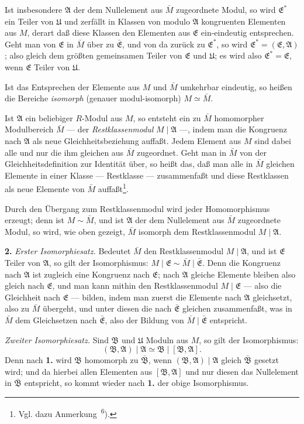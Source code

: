 \documentclass[12pt,a4paper]{article}
\newcommand{\fA}{\mathfrak{A}}
\newcommand{\fB}{\mathfrak{B}}
\newcommand{\fE}{\mathfrak{E}}
\newcommand{\fU}{\mathfrak{U}}
\theoremstyle{plain}
\theoremstyle{definition}
\theoremstyle{remark}
\begin{document}
Ist insbesondere $\fA$ der dem Nullelement aus $\bar{M}$ zugeordnete Modul, so wird $\fE^{*}$ ein Teiler von $\fU$ und zerfällt in Klassen von modulo $\fA$ kongruenten Elementen aus $M$, derart daß diese Klassen den Elementen aus $\fE$ ein-eindeutig entsprechen. Geht man von $\fE$ in $\bar{M}$ über zu $\bar{\fE}$, und von da zurück zu $\fE^{*}$, so wird $\fE^{*} = (\fE, \fA)$; also gleich dem größten gemeinsamen Teiler von $\fE$ und $\fU$; es wird also $\fE^{*} = \fE$, wenn $\fE$ Teiler von $\fU$.

Ist das Entsprechen der Elemente aus $M$ und $\bar{M}$ umkehrbar eindeutig, so heißen die Bereiche \textit{isomorph} (genauer modul-isomorph) $M \simeq \bar{M}$.

Ist $\fA$ ein beliebiger $R$-Modul aus $M$, so entsteht ein zu $\bar{M}$ homomorpher Modulbereich $\bar{M}$ --- der \textit{Restklassenmodul} $M \mid \fA$ ---, indem man die Kongruenz nach $\fA$ als neue Gleichheitsbeziehung auffaßt. Jedem Element aus $M$ sind dabei alle und nur die ihm gleichen aus $\bar{M}$ zugeordnet. Geht man in $\bar{M}$ von der Gleichheitsdefinition zur Identität über, so heißt das, daß man alle in $\bar{M}$ gleichen Elemente in einer Klasse --- Restklasse --- zusammenfaßt und diese Restklassen als neue Elemente von $\bar{M}$ auffaßt\footnote{Vgl. dazu Anmerkung\ \textsuperscript{6}).}.

Durch den Übergang zum Restklassenmodul wird jeder Homomorphismus erzeugt; denn ist $M \sim \bar{M}$, und ist $\fA$ der dem Nullelement aus $\bar{M}$ zugeordnete Modul, so wird, wie oben gezeigt, $\bar{M}$ isomorph dem Restklassenmodul $M \mid \fA$.

\medskip
\noindent
\textbf{2.} \textit{Erster Isomorphiesatz.} Bedeutet $\bar{M}$ den Restklassenmodul $M \mid \fA$, und ist $\fE$ Teiler von $\fA$, so gilt der Isomorphismus: $M \mid \fE \sim \bar{M} \mid \bar{\fE}$. Denn die Kongruenz nach $\fA$ ist zugleich eine Kongruenz nach $\fE$; nach $\fA$ gleiche Elemente bleiben also gleich nach $\fE$, und man kann mithin den Restklassenmodul $M \mid \fE$ --- also die Gleichheit nach $\fE$ --- bilden, indem man zuerst die Elemente nach $\fA$ gleichsetzt, also zu $\bar{M}$ übergeht, und unter diesen die nach $\bar{\fE}$ gleichen zusammenfaßt, was in $\bar{M}$ dem Gleichsetzen nach $\bar{\fE}$, also der Bildung von $\bar{M} \mid \bar{\fE}$ entspricht.

\textit{Zweiter Isomorphiesatz.} Sind $\fB$ und $\fU$ Moduln aus $M$, so gilt der Isomorphismus:
\[
(\fB, \fA) \mid \fA \simeq \fB \mid [\fB, \fA].
\]
Denn nach \textbf{1.} wird $\fB$ homomorph zu $\bar{\fB}$, wenn $(\fB, \fA) \mid \fA$ gleich $\bar{\fB}$ gesetzt wird; und da hierbei allen Elementen aus $[\fB, \fA]$ und nur diesen das Nullelement in $\bar{\fB}$ entspricht, so kommt wieder nach \textbf{1.} der obige Isomorphismus.
\end{document}
